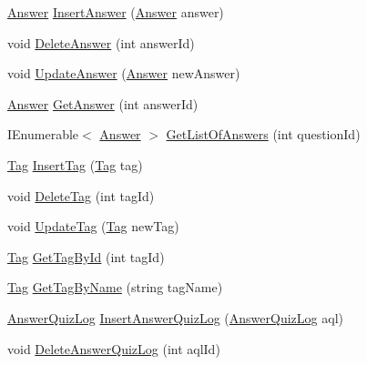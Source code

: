 \begin{DoxyCompactItemize}
\hyperlink{class_website_1_1_models_1_1_answer}{Answer} \hyperlink{interface_website_1_1_models_1_1_i_d_a_l_e_f_ac3bd3a52ae8a0019dab91a274bee988a}{Insert\+Answer} (\hyperlink{class_website_1_1_models_1_1_answer}{Answer} answer)
\item 
void \hyperlink{interface_website_1_1_models_1_1_i_d_a_l_e_f_ad88b19a65d90c99834fc916af46134e1}{Delete\+Answer} (int answer\+Id)
\item 
void \hyperlink{interface_website_1_1_models_1_1_i_d_a_l_e_f_a56cf2fc1e04fde1db74fc6342ee0fd49}{Update\+Answer} (\hyperlink{class_website_1_1_models_1_1_answer}{Answer} new\+Answer)
\item 
\hyperlink{class_website_1_1_models_1_1_answer}{Answer} \hyperlink{interface_website_1_1_models_1_1_i_d_a_l_e_f_a94f347cc5689d9b34874cc6a680229dd}{Get\+Answer} (int answer\+Id)
\item 
I\+Enumerable$<$ \hyperlink{class_website_1_1_models_1_1_answer}{Answer} $>$ \hyperlink{interface_website_1_1_models_1_1_i_d_a_l_e_f_aaeb225780038fb4f08ea1f1485f7ba99}{Get\+List\+Of\+Answers} (int question\+Id)
\item 
\hyperlink{class_website_1_1_models_1_1_tag}{Tag} \hyperlink{interface_website_1_1_models_1_1_i_d_a_l_e_f_aeb8b15542c21fa18706d992ba6bece9f}{Insert\+Tag} (\hyperlink{class_website_1_1_models_1_1_tag}{Tag} tag)
\item 
void \hyperlink{interface_website_1_1_models_1_1_i_d_a_l_e_f_a010f1d14eab4286e50669e1dd5de3e9a}{Delete\+Tag} (int tag\+Id)
\item 
void \hyperlink{interface_website_1_1_models_1_1_i_d_a_l_e_f_a554f86389b02c2f8abb446053c74b9f2}{Update\+Tag} (\hyperlink{class_website_1_1_models_1_1_tag}{Tag} new\+Tag)
\item 
\hyperlink{class_website_1_1_models_1_1_tag}{Tag} \hyperlink{interface_website_1_1_models_1_1_i_d_a_l_e_f_a7cdde17e9180c7c3747ff1d1eb6e1589}{Get\+Tag\+By\+Id} (int tag\+Id)
\item 
\hyperlink{class_website_1_1_models_1_1_tag}{Tag} \hyperlink{interface_website_1_1_models_1_1_i_d_a_l_e_f_aa5f4ec734c75daa8ca5ab0f6ff740b46}{Get\+Tag\+By\+Name} (string tag\+Name)
\item 
\hyperlink{class_website_1_1_models_1_1_answer_quiz_log}{Answer\+Quiz\+Log} \hyperlink{interface_website_1_1_models_1_1_i_d_a_l_e_f_aac373516f2cceb9c8bbc37ac3be7f313}{Insert\+Answer\+Quiz\+Log} (\hyperlink{class_website_1_1_models_1_1_answer_quiz_log}{Answer\+Quiz\+Log} aql)
\item 
void \hyperlink{interface_website_1_1_models_1_1_i_d_a_l_e_f_ad57ac195e76a6eab74aaf8c275031281}{Delete\+Answer\+Quiz\+Log} (int aql\+Id)

\end{DoxyCompactItemize}
